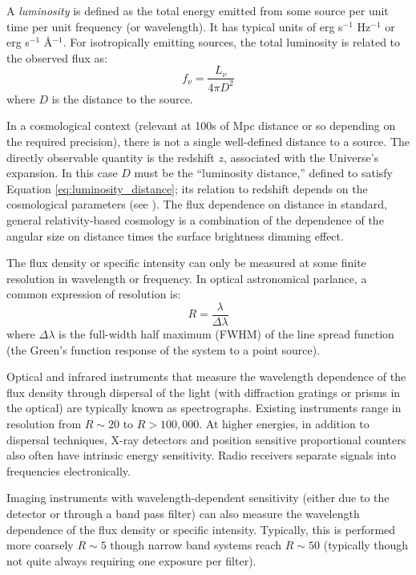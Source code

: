 A {\it luminosity} is defined as the total energy emitted from some
source per unit time per unit frequency (or wavelength). It has
typical units of erg s$^{-1}$ Hz$^{-1}$ or erg s$^{-1}$
\AA$^{-1}$. For isotropically emitting sources, the total luminosity
is related to the observed flux as:
\begin{equation}
\label{eq:luminosity_distance}
f_\nu = \frac{L_\nu}{4\pi D^2}
\end{equation}
where $D$ is the distance to the source.

In a cosmological context (relevant at 100s of Mpc distance or so
depending on the required precision), there is not a single
well-defined distance to a source. The directly observable quantity is
the redshift $z$, associated with the Universe's expansion. In this
case $D$ must be the ``luminosity distance,'' defined to satisfy
Equation \ref{eq:luminosity_distance}; its relation to redshift
depends on the cosmological parameters (see \citealt{hogg99cosm}). The
flux dependence on distance in standard, general relativity-based
cosmology is a combination of the dependence of the angular size on
distance times the surface brightness dimming effect.

The flux density or specific intensity can only be measured at some
finite resolution in wavelength or frequency. In optical astronomical
parlance, a common expression of resolution is:
\begin{equation}
R = \frac{\lambda}{\Delta \lambda}
\end{equation}
where $\Delta \lambda$ is the full-width half maximum (FWHM) of the
line spread function (the Green's function response of the system to a
point source).

Optical and infrared instruments that measure the wavelength
dependence of the flux density through dispersal of the light (with
diffraction gratings or prisms in the optical) are typically known as
spectrographs. Existing instruments range in resolution from $R\sim
20$ to $R>100,000$.  At higher energies, in addition to dispersal
techniques, X-ray detectors and position sensitive proportional
counters also often have intrinsic energy sensitivity.  Radio
receivers separate signals into frequencies electronically.

Imaging instruments with wavelength-dependent sensitivity (either due
to the detector or through a band pass filter) can also measure the
wavelength dependence of the flux density or specific
intensity. Typically, this is performed more coarsely $R\sim 5$ though
narrow band systems reach $R\sim 50$ (typically though not quite
always requiring one exposure per filter).

